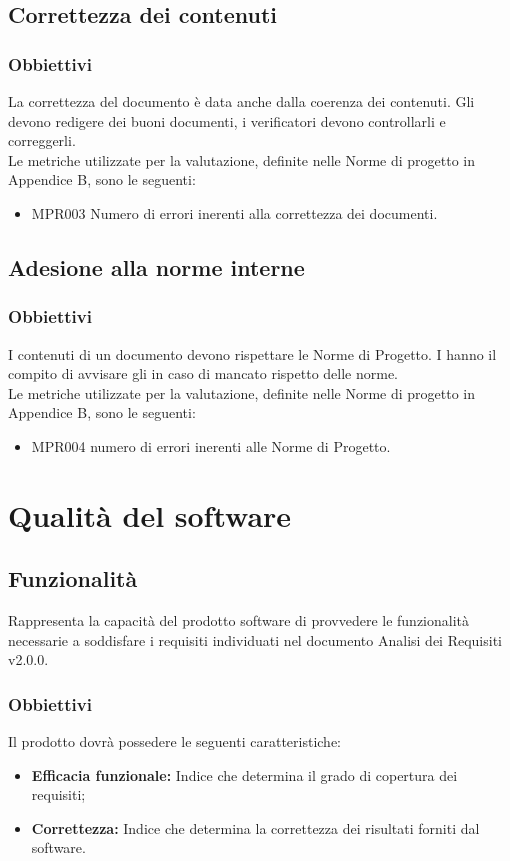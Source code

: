 \subsection{Correttezza dei contenuti}
\subsubsection{Obbiettivi}
La correttezza del documento è data anche dalla coerenza dei contenuti. Gli  devono redigere dei buoni documenti, i verificatori devono controllarli e correggerli.\\
Le metriche utilizzate per la valutazione, definite nelle Norme di progetto in Appendice B, sono le seguenti:
\begin{itemize}
    \item MPR003 Numero di errori inerenti alla correttezza dei documenti.
\end{itemize}
\subsection{Adesione alla norme interne}
\subsubsection{Obbiettivi}
I contenuti di un documento devono rispettare le Norme di Progetto. I  hanno il compito di avvisare gli  in caso di mancato rispetto delle norme.\\
Le metriche utilizzate per la valutazione, definite nelle Norme di progetto in Appendice B, sono le seguenti:
\begin{itemize}
    \item MPR004 numero di errori inerenti alle Norme di Progetto.
\end{itemize}

\section{Qualità del software}
\label{software}

\subsection{Funzionalità}
Rappresenta la capacità del prodotto software di provvedere le funzionalità necessarie a soddisfare i requisiti individuati nel documento Analisi dei Requisiti v2.0.0. 
\subsubsection{Obbiettivi }Il prodotto dovrà possedere le seguenti caratteristiche:
\begin{itemize}
	\item \textbf{Efficacia funzionale:} Indice che determina il grado di copertura dei requisiti;
	\item \textbf{Correttezza:} Indice che determina la correttezza dei risultati forniti dal software.
\end{itemize}

